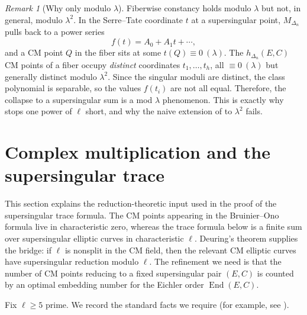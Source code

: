 \documentclass[12pt]{amsart}
\theoremstyle{definition}
\theoremstyle{remark}
\newtheorem{remark}{Remark}
\begin{document}
\begin{remark}[Why only modulo $\lambda$]\label{rmk:only-mod-lambda}
Fiberwise constancy holds modulo $\lambda$ but not, in general, modulo $\lambda^2$. In the
Serre--Tate coordinate $t$ at a supersingular point, $M_{\Delta_n}$ pulls back to a power
series 
$$f(t)=A_0+A_1t+\cdots,
$$
and a CM point $Q$ in the fiber sits at some $t(Q)\equiv0\ (\lambda)$.
The $h_{\Delta_n}(E,C)$ CM points of a fiber occupy \emph{distinct} coordinates
$t_1,\dots,t_h$, all $\equiv0\ (\lambda)$ but generally distinct modulo $\lambda^2$. Since the
singular moduli are distinct, the class polynomial is separable, so the values $f(t_i)$ are
not all equal. Therefore, the collapse to a supersingular sum is a mod $\lambda$ phenomenon. This
is exactly why  stops one power of $\ell$ short, and why the naive extension of
 to $\lambda^2$ fails.
\end{remark}

\section{Complex multiplication and the supersingular trace}\label{sec:CM}
This section explains the reduction-theoretic input used in the proof of
the supersingular trace formula.  The CM points appearing in the
Bruinier--Ono formula live in characteristic zero, whereas the trace
formula below is a finite sum over supersingular elliptic curves in
characteristic $\ell$.  Deuring's theorem supplies the bridge: if
$\ell$ is nonsplit in the CM field, then the relevant CM elliptic curves
have supersingular reduction modulo $\ell$.  The refinement we need is
that the number of CM points reducing to a fixed supersingular pair
$(E,C)$ is counted by an optimal embedding number for the Eichler order
$\operatorname{End}(E,C)$. 

Fix $\ell\ge5$ prime. We record the standard facts we require (for example, see
\cite{Cox,KatzMazur,Silverman-AT,Vigneras,Pizer}).
\end{document}
